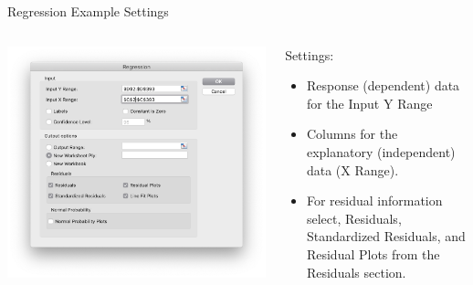 \documentclass[xcolor=svgnames, handout]{beamer}
\begin{document}
\begin{frame}[label=current]{Regression Example Settings}
\begin{columns}[T] %
\begin{column}{.6\textwidth}
\includegraphics[height=.6\textheight]{RegressionSettings}
\end{column}%
\hfill%
\begin{column}{.5\textwidth}
Settings:
\begin{itemize}
\item Response (dependent) data for the Input Y Range
\item Columns for the explanatory (independent) data (X Range). 
\item For residual information select, Residuals, Standardized Residuals, and Residual Plots from the Residuals section. 
\end{itemize}
\end{column}%
\end{columns}
\end{frame}
\end{document}
